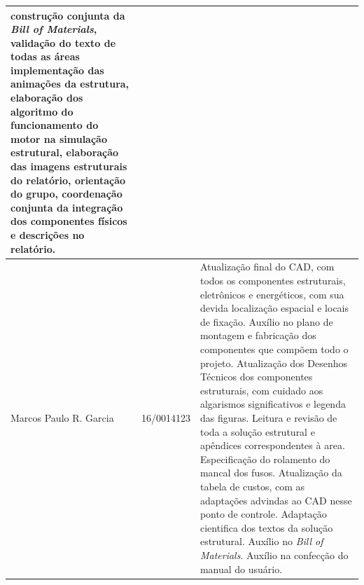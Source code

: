\begin{apendicesenv}
\begin{table}[H]
\begin{adjustbox}{max width = \textwidth}
\begin{tabular}{|G{4cm}|c|L{10cm}|}
construção conjunta da \textit{Bill of Materials}, validação do texto de todas as áreas implementação das animações da estrutura, elaboração dos algoritmo do funcionamento do motor na simulação estrutural, elaboração das imagens estruturais do relatório, orientação do grupo, coordenação conjunta da integração dos componentes físicos e descrições no relatório. \\ \hline
        Marcos Paulo R. Garcia & 16/0014123 & Atualização final do CAD, com todos os componentes estruturais, eletrônicos e energéticos, com sua devida localização espacial e locais de fixação. Auxílio no plano de montagem e fabricação dos componentes que compõem todo o projeto. Atualização dos Desenhos Técnicos dos componentes estruturais, com cuidado aos algarismos significativos e legenda das figuras. Leitura e revisão de toda a solução estrutural e apêndices correspondentes à area. Especificação do rolamento do mancal dos fusos. Atualização da tabela de custos, com as adaptações advindas ao CAD nesse ponto de controle. Adaptação cientifica dos textos da solução estrutural. Auxílio no \textit{Bill of Materials}. Auxílio na confecção do manual do usuário. \\ \hline
        \end{tabular}
    \end{adjustbox}
\end{table}




\end{apendicesenv}
